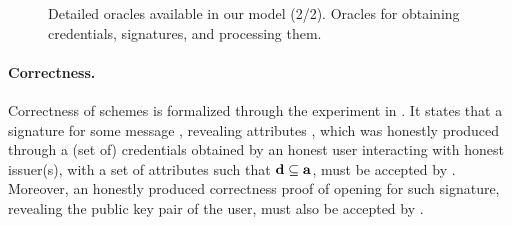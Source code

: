 {\begin{figure*}[htp!]
{\begin{minipage}[t]{.5\textwidth}
      \end{minipage}
      
    }

    \caption{Detailed oracles available in our model (2/2). Oracles for
      obtaining credentials, signatures, and processing them.}
    \label{fig:oracles2}
  \end{figure*}
}

\paragraph{Correctness.} %
Correctness of \UAS schemes is formalized through the experiment in
. It states that a signature for some message \msg,
revealing attributes \dattrs, which was honestly produced through a (set of)
credentials obtained by an honest user interacting with honest issuer(s), with a
set of attributes \attrs such that $\mathbf{d} \subseteq \mathbf{a}$, must be accepted
by \Verify. Moreover, an honestly produced correctness proof of opening for such
signature, revealing the public key pair of the user, must also be accepted by
\Judge.

